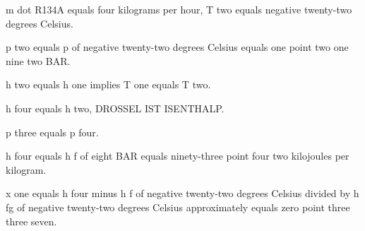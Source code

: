 m dot R134A equals four kilograms per hour, T two equals negative twenty-two degrees Celsius.

p two equals p of negative twenty-two degrees Celsius equals one point two one nine two BAR.

h two equals h one implies T one equals T two.

h four equals h two, DROSSEL IST ISENTHALP.

p three equals p four.

h four equals h f of eight BAR equals ninety-three point four two kilojoules per kilogram.

x one equals h four minus h f of negative twenty-two degrees Celsius divided by h fg of negative twenty-two degrees Celsius approximately equals zero point three three seven.